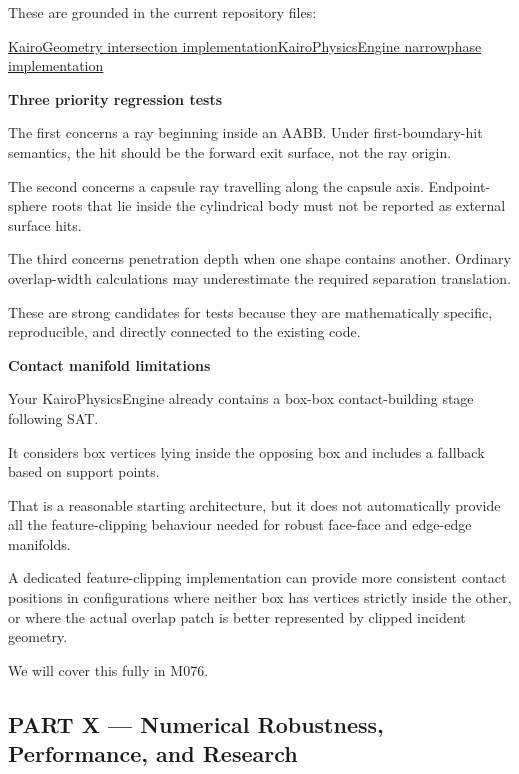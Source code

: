 These are grounded in the current repository files:

\href{https://github.com/swayam8624/KairoGeometry/blob/master/Intersection.cppm?utm_source=chatgpt.com}{KairoGeometry intersection implementation}\href{https://github.com/swayam8624/KairoPhysicsEngine/blob/main/Narrowphase.cppm?utm_source=chatgpt.com}{KairoPhysicsEngine narrowphase implementation}

\textbf{Three priority regression tests}

The first concerns a ray beginning inside an AABB. Under first-boundary-hit semantics, the hit should be the forward exit surface, not the ray origin.

The second concerns a capsule ray travelling along the capsule axis. Endpoint-sphere roots that lie inside the cylindrical body must not be reported as external surface hits.

The third concerns penetration depth when one shape contains another. Ordinary overlap-width calculations may underestimate the required separation translation.

These are strong candidates for tests because they are mathematically specific, reproducible, and directly connected to the existing code.

\textbf{Contact manifold limitations}

Your KairoPhysicsEngine already contains a box-box contact-building stage following SAT.

It considers box vertices lying inside the opposing box and includes a fallback based on support points.

That is a reasonable starting architecture, but it does not automatically provide all the feature-clipping behaviour needed for robust face-face and edge-edge manifolds.

A dedicated feature-clipping implementation can provide more consistent contact positions in configurations where neither box has vertices strictly inside the other, or where the actual overlap patch is better represented by clipped incident geometry.

We will cover this fully in M076.

\subsection{PART X --- Numerical Robustness, Performance, and Research}\label{04-visual-computing-ii-ch025-part-x-numerical-robustness-performance-and-research}

